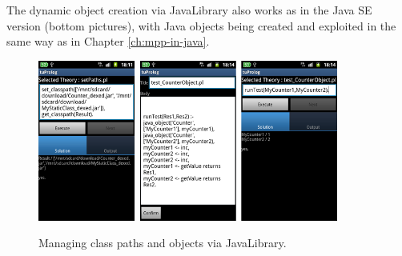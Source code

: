 The dynamic object creation via JavaLibrary also works as in the Java SE version (bottom pictures), with Java objects being created and exploited in the same way as in Chapter \ref{ch:mpp-in-java}.
%
\begin{figure}
\centering
  \includegraphics[height=200px]{images/android12.png}~\includegraphics[height=200px]{images/android13.png}
  \caption{Managing class paths and objects via JavaLibrary.}\label{fig:android12}
\end{figure}


